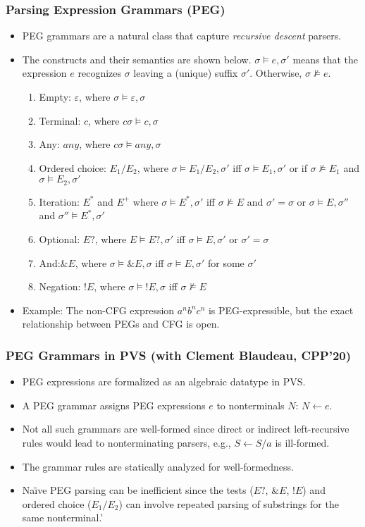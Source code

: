 \documentclass[xcolor=dvipsnames]{beamer}
\begin{document}
\begin{frame}[fragile]
\frametitle{Parsing Expression Grammars (PEG)}
\begin{itemize}
\item PEG grammars are a natural class that capture \emph{recursive descent}
parsers.
\item The constructs and their semantics are shown below.  $\sigma \models e, \sigma'$ means that
the expression $e$ recognizes $\sigma$ leaving a (unique) suffix $\sigma'$.  Otherwise, $\sigma\not\models e$\@.  
\begin{enumerate}
\item Empty: $\varepsilon$, where $\sigma \models \varepsilon, \sigma$
\item Terminal: $c$, where $c\sigma \models c, \sigma$
  \item Any: $\mathit{any}$, where $c\sigma \models \mathit{any}, \sigma$
\item Ordered choice: $E_1/E_2$, where $\sigma \models E_1/E_2, \sigma'$ iff $\sigma\models E_1, \sigma'$ or if $\sigma\not\models E_1$ and $\sigma\models E_2, \sigma'$
\item Iteration: $E^*$ and $E^+$ where $\sigma\models E^*, \sigma'$ iff $\sigma\not\models E$ and $\sigma' = \sigma$ or $\sigma\models E, \sigma''$ and $\sigma''\models E^*, \sigma'$
\item Optional: $E?$, where $E\models E?, \sigma'$ iff $\sigma\models E, \sigma'$ or $\sigma' = \sigma$
\item And:$\& E$, where $\sigma\models \& E, \sigma$ iff $\sigma \models E, \sigma'$ for some $\sigma'$
\item Negation: $!E$, where $\sigma \models !E, \sigma$ iff $\sigma\not\models E$
\end{enumerate}
\item Example: The non-CFG expression $a^nb^nc^n$ is PEG-expressible, but the exact relationship between PEGs and CFG is open.  
\end{itemize}
\end{frame}


\begin{frame}[fragile]
\frametitle{PEG Grammars in PVS (with Clement Blaudeau, CPP'20)}
\begin{itemize}
\item PEG expressions are formalized as an algebraic datatype in PVS.  
\item A PEG grammar assigns PEG expressions $e$ to  nonterminals $N$: $N \leftarrow e$. 
\item Not all such grammars are well-formed since direct or indirect
left-recursive rules would lead to nonterminating parsers, e.g., $S \leftarrow S/a$
is ill-formed. 
\item The grammar rules are statically analyzed for well-formedness.
\item Na\"{\i}ve PEG parsing can be inefficient since the tests ($E?$,
$\&E$, $!E$) and ordered choice ($E_1/ E_2$) can involve repeated
parsing of substrings for the same nonterminal.'
\end{itemize}
\end{frame}
\end{document}
